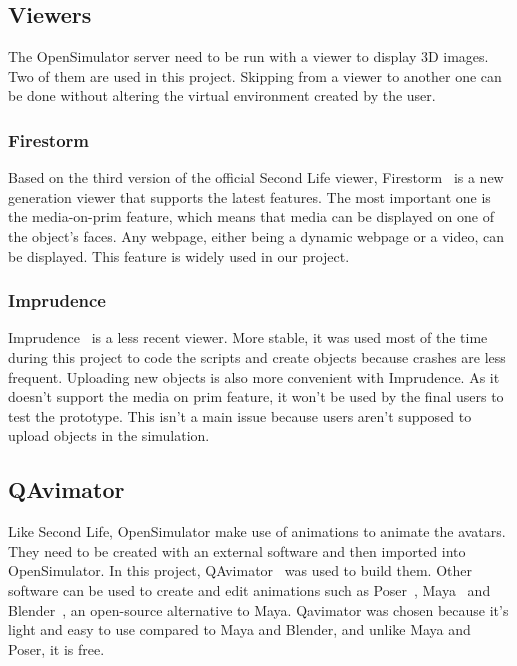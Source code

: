 \subsection{Viewers}

The OpenSimulator server need to be run with a viewer to display 3D images. Two of them are used in this project. Skipping from a viewer to another one can be done without altering the virtual environment created by the user.  
\subsubsection{Firestorm}
Based on the third version of the official Second Life viewer, Firestorm~\cite{firestormWebsite} is a new generation viewer that supports the latest features. The most important one is the media-on-prim feature, which means that media can be displayed on one of the object's faces. Any webpage, either being a dynamic webpage or a video, can be displayed. This feature is widely used in our project.

\subsubsection{Imprudence}
Imprudence~\cite{imprudenceWebsite} is a less recent viewer. More stable, it was used most of the time during this project to code the scripts and create objects because crashes are less frequent. Uploading new objects is also more convenient with Imprudence. As it doesn't support the media on prim feature, it won't be used by the final users to test the prototype. This isn't a main issue because users aren't supposed to upload objects in the simulation.


\subsection{QAvimator}
\label{sec:animText}
Like Second Life, OpenSimulator make use of animations to animate the avatars. They need to be created with an external software and then imported into OpenSimulator.
In this project, QAvimator~\cite{qavimatorWebsite} was used to build them. Other software can be used to create and edit animations such as Poser~\cite{PoserWebsite}, Maya~\cite{mayaWebsite} and Blender~\cite{BlenderWebsite}, an open-source alternative to Maya. Qavimator was chosen because it's light and easy to use compared to Maya and Blender, and unlike Maya and Poser, it is free.\\

